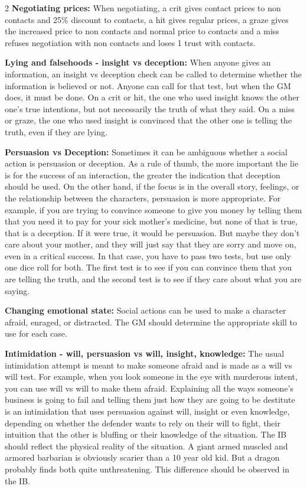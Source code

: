 \begin{multicols}{2}
\textbf{Negotiating prices:} When negotiating, a crit gives contact prices to non contacts and 25\% discount to contacts, a hit gives regular prices, a graze gives the increased price to non contacts and normal price to contacts and a miss refuses negotiation with non contacts and loses 1 trust with contacts. 

\textbf{Lying and falsehoods - insight vs deception:} When anyone gives an information, an insight vs deception check can be called to determine whether the information is believed or not. Anyone can call for that test, but when the GM does, it must be done. On a crit or hit, the one who used insight knows the other one's true intentions, but not necessarily the truth of what they said. On a miss or graze, the one who used insight is convinced that the other one is telling the truth, even if they are lying. 

\textbf{Persuasion vs Deception:} Sometimes it can be ambiguous whether a social action is persuasion or deception. As a rule of thumb, the more important the lie is for the success of an interaction, the greater the indication that deception should be used. On the other hand, if the focus is in the overall story, feelings, or the relationship between the characters, persuasion is more appropriate. For example, if you are trying to convince someone to give you money by telling them that you need it to pay for your sick mother's medicine, but none of that is true, that is a deception. If it were true, it would be persuasion. But maybe they don't care about your mother, and they will just say that they are sorry and move on, even in a critical success. In that case, you have to pass two tests, but use only one dice roll for both. The first test is to see if you can convince them that you are telling the truth, and the second test is to see if they care about what you are saying.  

\textbf{Changing emotional state:} Social actions can be used to make a character afraid, enraged, or distracted. The GM should determine the appropriate skill to use for each case. 

\textbf{Intimidation - will, persuasion vs will, insight, knowledge:} The usual intimidation attempt is meant to make someone afraid and is made as a will vs will test. For example, when you look someone in the eye with murderous intent, you can use will vs will to make them afraid. Explaining all the ways someone's business is going to fail and telling them just how they are going to be destitute is an intimidation that uses persuasion against will, insight or even knowledge, depending on whether the defender wants to rely on their will to fight, their intuition that the other is bluffing or their knowledge of the situation. The IB should reflect the physical reality of the situation. A giant armed muscled and armored barbarian is obviously scarier than a 10 year old kid. But a dragon probably finds both quite unthreatening. This difference should be observed in the IB.


\end{multicols}
